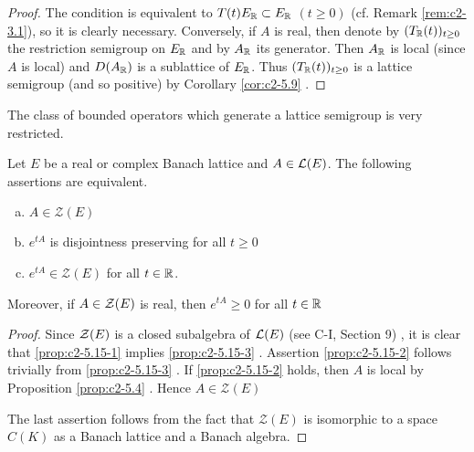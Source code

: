 \begin{proof}
The condition is equivalent to $T(t)E_{\mathbb{R}} \subset E_{\mathbb{R}}$ $(t \geq 0)$ (cf. Remark \ref{rem:c2-3.1}), so it is clearly necessary.
Conversely, if $A$ is real, then denote by $(T_{\mathbb{R}}(t))_{t \geq 0}$ the restriction semigroup on $E_{\mathbb{R}}$ and by $A_{\mathbb{R}}$ its generator.
Then $A_{\mathbb{R}}$ is local (since $A$ is local) and $D(A_{\mathbb{R}})$ is a sublattice of $E_{\mathbb{R}}$.
Thus $(T_{\mathbb{R}}(t))_{t \geq 0}$ is a lattice semigroup (and so positive) by Corollary \ref{cor:c2-5.9}  .
\end{proof}

The class of bounded operators which generate a lattice semigroup is very restricted.

\begin{proposition}\label{prop:c2-5.15}
Let $E$ be a real or complex Banach lattice and $A \in \mathcal{L}(E)$. 
The following assertions are equivalent.
\begin{enumerate}[(a)]
\item \label{prop:c2-5.15-1}
$A \in \mathcal{Z}(E)$
\item \label{prop:c2-5.15-2}
$e^{tA}$ is disjointness preserving for all $t \geq 0$
\item \label{prop:c2-5.15-3}
$e^{tA} \in \mathcal{Z}(E)$ for all $t \in \mathbb{R}$.
\end{enumerate}
Moreover, if $A \in \mathcal{Z}(E)$ is real, then $e^{tA} \geq 0$ for all $t \in \mathbb{R}$
\end{proposition}

\begin{proof}
Since $\mathcal{Z}(E)$ is a closed subalgebra of $\mathcal{L}(E)$ (see C-I, Section 9)
, it is clear that \ref{prop:c2-5.15-1}   implies \ref{prop:c2-5.15-3} .
Assertion \ref{prop:c2-5.15-2}  follows trivially from \ref{prop:c2-5.15-3}  .
If \ref{prop:c2-5.15-2}   holds, then $A$ is local by  Proposition \ref{prop:c2-5.4}  .
Hence $A \in \mathcal{Z}(E)$

The last assertion follows from the fact that $\mathcal{Z}(E)$ is isomorphic to a space $C(K)$ as a Banach lattice and a Banach algebra.
\end{proof}

